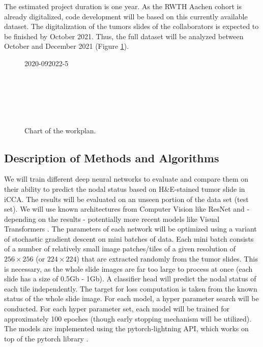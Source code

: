 \documentclass[12pt]{article}
\begin{document}
The estimated project duration is one year. As the RWTH Aachen cohort is already digitalized, code development will be based on this currently available dataset. The digitalization of the tumors slides of the collaborators is expected to be finished by October 2021. Thus, the full dataset will be analyzed between October and December 2021 (Figure \ref{fig:chart}).

\begin{figure}[htp]
\begin{ganttchart}[y unit title=0.6cm,
y unit chart=0.5cm,
hgrid,vgrid,
	time slot format=isodate-yearmonth,
	time slot unit=month,
	title height=.75, title top shift=0,
	bar height=0.6]{2020-09}{2022-5}
	 \\
	\\
	\\
	\\
	\\
	\\
\end{ganttchart}
\caption{Chart of the workplan.}
\label{fig:chart}
\end{figure}

\subsection{Description of Methods and Algorithms}
We will train different deep neural networks to evaluate and compare them on their ability to predict the nodal status based on H\&E-stained tumor slide in iCCA. The results will be evaluated on an unseen portion of the data set (test set). We will use known architectures from Computer Vision like ResNet and - depending on the results - potentially more recent models like Visual Transformers \cite{b23, b24}. The parameters of each network will be optimized using a variant of stochastic gradient descent on mini batches of data. Each mini batch consists of a number of relatively small image patches/tiles of a given resolution of $256\times 256$ (or $224 \times 224$) that are extracted randomly from the tumor slides. This is necessary, as the whole slide images are far too large to process at once (each slide has a size of 0.5Gb - 1Gb). A classifier head will predict the nodal status of each tile independently. The target for loss computation is taken from the known status of the whole slide image. For each model, a hyper parameter search will be conducted. For each hyper parameter set, each model will be trained for approximately 100 epoches (though early stopping mechanism will be utilized). The models are implemented using the pytorch-lightning API, which works on top of the pytorch library \cite{b25, b26}.
\end{document}
